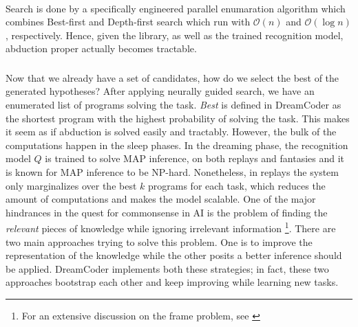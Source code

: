 \paragraph{}
Search is done by a specifically engineered parallel enumaration algorithm which combines Best-first and Depth-first search which run with $\mathcal{O}(n)$ and $\mathcal{O}(\log n)$, respectively. Hence, given the library, as well as the trained recognition model, abduction proper actually becomes tractable.




\subsubsection{}
Now that we already have a set of candidates, how do we select the best of the generated hypotheses? After applying neurally guided search, we have an enumerated list of programs solving the task. \textit{Best} is defined in DreamCoder as the shortest program with the highest probability of solving the task. This makes it seem as if abduction is solved easily and tractably. However, the bulk of the computations happen in the sleep phases. In the dreaming phase, the recognition model $Q$ is trained to solve MAP inference, on both replays and fantasies and it is known for MAP inference to be NP-hard. Nonetheless, in replays the system only marginalizes over the best $k$ programs for each task, which reduces the amount of computations and makes the model scalable. 
One of the major hindrances in the quest for commonsense in AI is the problem of finding the \emph{relevant} pieces of knowledge while ignoring irrelevant information \footnote{For an extensive discussion on the frame problem, see \cite{haselager1997}}.
There are two main approaches trying to solve this problem. One is to improve the representation of the knowledge while the other posits a better inference should be applied. DreamCoder implements both these strategies; in fact, these two approaches bootstrap each other and keep improving while learning new tasks.

